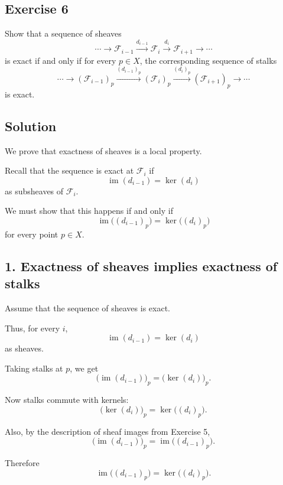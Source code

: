 
\subsection*{Exercise 6}

Show that a sequence of sheaves
\[
\cdots
\longrightarrow
\mathcal F_{i-1}
\xrightarrow{d_{i-1}}
\mathcal F_i
\xrightarrow{d_i}
\mathcal F_{i+1}
\longrightarrow
\cdots
\]
is exact if and only if for every $p \in X$, the corresponding sequence of
stalks
\[
\cdots
\longrightarrow
(\mathcal F_{i-1})_p
\xrightarrow{(d_{i-1})_p}
(\mathcal F_i)_p
\xrightarrow{(d_i)_p}
(\mathcal F_{i+1})_p
\longrightarrow
\cdots
\]
is exact.

\subsection*{Solution}

We prove that exactness of sheaves is a local property.

Recall that the sequence is exact at $\mathcal F_i$ if
\[
\operatorname{im}(d_{i-1})
=
\ker(d_i)
\]
as subsheaves of $\mathcal F_i$.

We must show that this happens if and only if
\[
\operatorname{im}\bigl((d_{i-1})_p\bigr)
=
\ker\bigl((d_i)_p\bigr)
\]
for every point $p \in X$.

\subsection*{1. Exactness of sheaves implies exactness of stalks}

Assume that the sequence of sheaves is exact.

Thus, for every $i$,
\[
\operatorname{im}(d_{i-1})
=
\ker(d_i)
\]
as sheaves.

Taking stalks at $p$, we get
\[
\bigl(\operatorname{im}(d_{i-1})\bigr)_p
=
\bigl(\ker(d_i)\bigr)_p.
\]

Now stalks commute with kernels:
\[
\bigl(\ker(d_i)\bigr)_p
=
\ker\bigl((d_i)_p\bigr).
\]

Also, by the description of sheaf images from Exercise 5,
\[
\bigl(\operatorname{im}(d_{i-1})\bigr)_p
=
\operatorname{im}\bigl((d_{i-1})_p\bigr).
\]

Therefore
\[
\operatorname{im}\bigl((d_{i-1})_p\bigr)
=
\ker\bigl((d_i)_p\bigr).
\]

